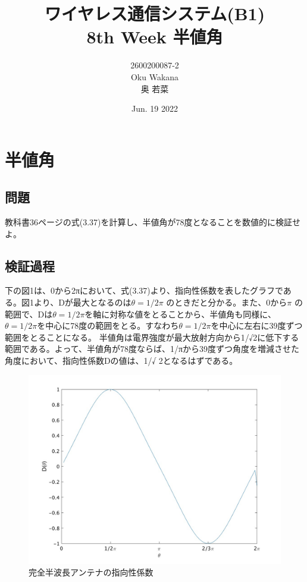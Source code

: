 \documentclass[dvipdfmx,autodetect-engine,titlepage]{jsarticle}
\title{ワイヤレス通信システム(B1)\\
8th Week 半値角\\
}
\author{2600200087-2\\Oku Wakana\\奥 若菜}
\date{Jun. 19 2022}
\begin{document}
\maketitle

\section{半値角}
\subsection{問題}
教科書36ページの式(3.37)を計算し、半値角が78度となることを数値的に検証せよ。\\

\subsection{検証過程}
下の図1は、0から2πにおいて、式(3.37)より、指向性係数を表したグラフである。図1より、Dが最大となるのは\begin{math}
  \theta = 1/2 \pi
\end{math}
のときだと分かる。また、0から\begin{math}
\pi
\end{math}
の範囲で、Dは\begin{math}\theta = 1/2 \pi\end{math}を軸に対称な値をとることから、半値角も同様に、
\begin{math}\theta = 1/2 \pi\end{math}を中心に78度の範囲をとる。すなわち\begin{math}\theta = 1/2 \pi\end{math}を中心に左右に39度ずつ範囲をとることになる。
半値角は電界強度が最大放射方向から1/√2に低下する範囲である。よって、半値角が78度ならば、1/πから39度ずつ角度を増減させた角度において、指向性係数Dの値は、1/√
2となるはずである。\\

\begin{figure}[H]
  \centering
  \includegraphics[scale=0.28]{f1.jpg} 
  \caption{完全半波長アンテナの指向性係数}\label{fig:図1}
\end{figure}
\end{document}

